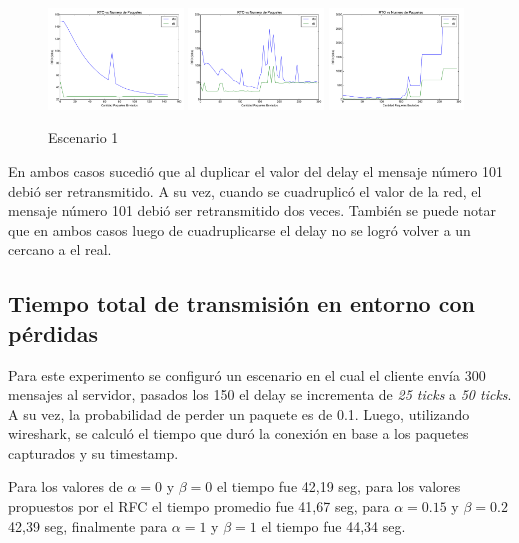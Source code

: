         \begin{figure}[H]
            \center
	        
		    \includegraphics[width=0.32\textwidth]{imagenes/rtt_vs_n_8_2.pdf}
		    \includegraphics[width=0.32\textwidth]{imagenes/congestion_50_8_2.pdf}
		    \includegraphics[width=0.32\textwidth]{imagenes/congestion_100_8_2.pdf}

            \caption{Escenario 1}
	
        \end{figure}          

        En ambos casos sucedi\'o que al duplicar el valor del delay el 
        mensaje n\'umero 101 debi\'o ser retransmitido. A su vez, cuando 
        se cuadruplic\'o el valor de la red, el mensaje n\'umero 101 debi\'o
        ser retransmitido dos veces. 
        Tambi\'en se puede notar que en ambos casos luego de cuadruplicarse
        el delay no se logr\'o volver a un \rto{} cercano a el \rtt{} real.


    \subsection{Tiempo total de transmisi\'on en entorno con p\'erdidas}
        
        Para este experimento se configur\'o un escenario en el cual el 
        cliente env\'ia 300 mensajes al servidor, pasados los 150 el delay
        se incrementa de \textit{25 ticks} a \textit{50 ticks}. A su vez,
        la probabilidad de perder un paquete es de 0.1.
        Luego, utilizando wireshark, se calcul\'o el tiempo que dur\'o la
        conexi\'on en base a los paquetes capturados y su timestamp.
        
        Para los valores de $\alpha=0$ y $\beta=0$ el tiempo fue 42,19 seg,
        para los valores propuestos por el RFC el tiempo promedio fue
        41,67 seg, para $\alpha=0.15$ y $\beta=0.2$ 42,39 seg, finalmente  
        para $\alpha=1$ y $\beta=1$ el tiempo fue 44,34 seg.
        

